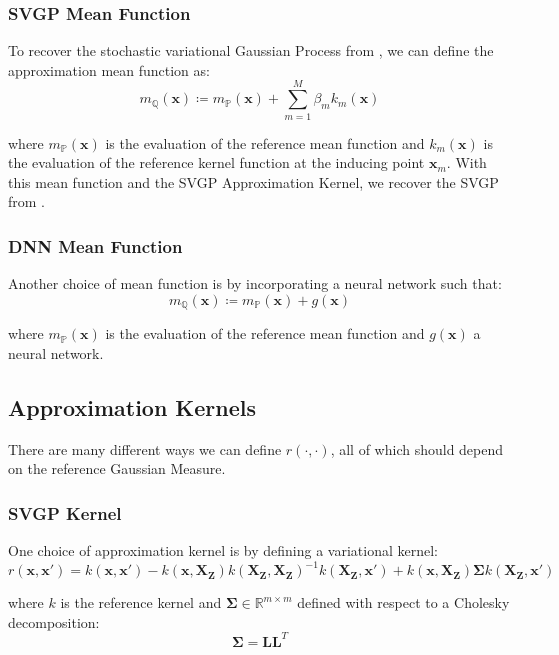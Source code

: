 \documentclass[twoside,11pt]{article}
\begin{document}
\subsubsection{SVGP Mean Function}
To recover the stochastic variational Gaussian Process from \cite{titsias2009variational}, we can define the approximation mean function as:
\[m_{\mathbb{Q}}(\mathbf{x}) \coloneqq m_{\mathbb{P}}(\mathbf{x}) + \sum_{m=1}^{M} \beta_m k_m(\mathbf{x})\]

where $m_{\mathbb{P}}(\mathbf{x})$ is the evaluation of the reference mean function and $k_m(\mathbf{x})$ is the evaluation of the reference kernel function at the inducing point $\mathbf{x}_m$.
With this mean function and the SVGP Approximation Kernel, we recover the SVGP from \cite{titsias2009variational}.

\subsubsection{DNN Mean Function}

Another choice of mean function is by incorporating a neural network such that:
\[m_{\mathbb{Q}}(\mathbf{x}) \coloneqq m_{\mathbb{P}}(\mathbf{x}) + g(\mathbf{x})\]

where $m_{\mathbb{P}}(\mathbf{x})$ is the evaluation of the reference mean function and $g(\mathbf{x})$ a neural network.

\subsection{Approximation Kernels}\label{subsec:approximation-kernels}

There are many different ways we can define $r(\cdot, \cdot)$, all of which should depend on the reference Gaussian Measure.

\subsubsection{SVGP Kernel}

One choice of approximation kernel is by defining a variational kernel:
\[r(\mathbf{x}, \mathbf{x}') = k(\mathbf{x}, \mathbf{x}') - k(\mathbf{x}, \mathbf{X}_{\mathbf{Z}})k(\mathbf{X}_{\mathbf{Z}}, \mathbf{X}_{\mathbf{Z}})^{-1}k(\mathbf{X}_{\mathbf{Z}}, \mathbf{x}') + k(\mathbf{x}, \mathbf{X}_{\mathbf{Z}})\mathbf{\Sigma}k(\mathbf{X}_{\mathbf{Z}}, \mathbf{x}')\]

where $k$ is the reference kernel and $\mathbf{\Sigma} \in \mathbb{R}^{m \times m}$ defined with respect to a Cholesky decomposition:
\[\mathbf{\Sigma} = \mathbf{L}\mathbf{L}^T\]
\end{document}
